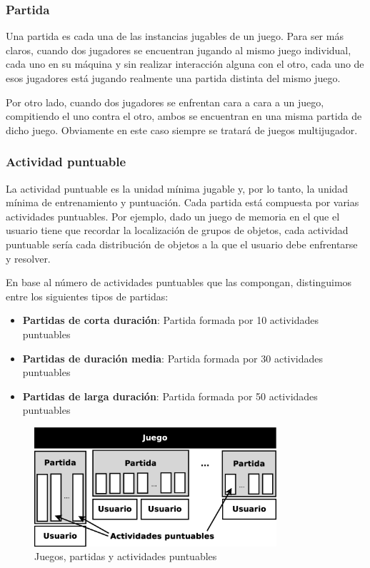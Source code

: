 \subsubsection{Partida}

Una partida es cada una de las instancias jugables de un juego. Para ser más claros, cuando dos jugadores se encuentran jugando al mismo juego individual, cada uno en su máquina y sin realizar interacción alguna con el otro, cada uno de esos jugadores está jugando realmente una partida distinta del mismo juego.

Por otro lado, cuando dos jugadores se enfrentan cara a cara a un juego, compitiendo el uno contra el otro, ambos se encuentran en una misma partida de dicho juego. Obviamente en este caso siempre se tratará de juegos multijugador.

\subsubsection{Actividad puntuable}

La actividad puntuable es la unidad mínima jugable y, por lo tanto, la unidad mínima de entrenamiento y puntuación. Cada partida está compuesta por varias actividades puntuables. Por ejemplo, dado un juego de memoria en el que el usuario tiene que recordar la localización de grupos de objetos, cada actividad puntuable sería cada distribución de objetos a la que el usuario debe enfrentarse y resolver.

En base al número de actividades puntuables que las compongan, distinguimos entre los siguientes tipos de partidas:

\begin{itemize}
\item {\bf Partidas de corta duración}: Partida formada por 10 actividades puntuables
\item {\bf Partidas de duración media}: Partida formada por 30 actividades puntuables
\item {\bf Partidas de larga duración}: Partida formada por 50 actividades puntuables
\end{itemize}

\begin{figure}[H]
  \begin{center}
    \includegraphics[width=0.8\textwidth]{images/juegos-partidas-actividades.eps}
    \caption{Juegos, partidas y actividades puntuables}
    \label{fig::juegos-partidas-actividades}
  \end{center}
\end{figure}


